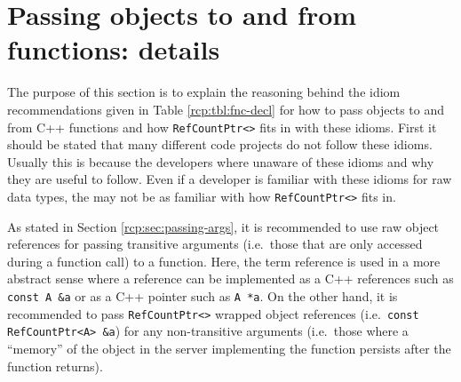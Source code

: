 %
\section{Passing objects to and from functions: details}
\label{rcp:apdx:passing_args}
%

The purpose of this section is to explain the reasoning behind the
idiom recommendations given in Table {}\ref{rcp:tbl:fnc-decl} for how
to pass objects to and from C++ functions and how
{}\texttt{Ref\-Count\-Ptr<>} fits in with these idioms.  First it
should be stated that many different code projects do not follow these
idioms.  Usually this is because the developers where unaware of these
idioms and why they are useful to follow.  Even if a developer is
familiar with these idioms for raw data types, the may not be as
familiar with how {}\texttt{Ref\-Count\-Ptr<>} fits in.

As stated in Section {}\ref{rcp:sec:passing-args}, it is recommended
to use raw object references for passing transitive arguments
(i.e.~those that are only accessed during a function call) to a
function.  Here, the term reference is used in a more abstract sense
where a reference can be implemented as a C++ references such as
{}\texttt{const A \&a} or as a C++ pointer such as {}\texttt{A *a}.
On the other hand, it is recommended to pass
{}\texttt{Ref\-Count\-Ptr<>} wrapped object references
(i.e.~{}\texttt{const Ref\-Count\-Ptr<A> \&a}) for any non-transitive
arguments (i.e.~those where a ``memory'' of the object in the server
implementing the function persists after the function returns).


